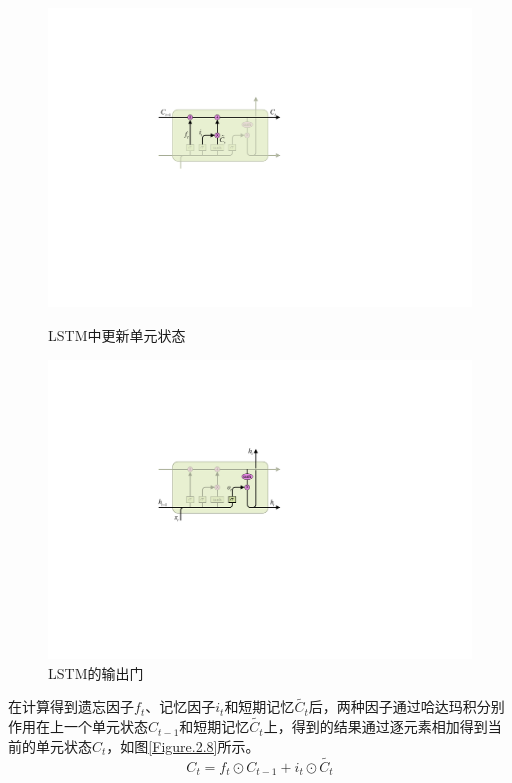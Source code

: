 \documentclass[master]{thesis-uestc}
\begin{document}
\begin{figure}[!ht]
\centering 
\begin{minipage}[b]{0.45\textwidth}
\centering
\includegraphics[width=1.0\textwidth]{./pic/LSTM-C.pdf}
\caption{LSTM中更新单元状态}
\label{Figure.2.8}
\end{minipage}
\begin{minipage}[b]{0.45\textwidth} 
\centering 
\includegraphics[width=1.0\textwidth]{./pic/LSTM-o.pdf}
\caption{LSTM的输出门}
\label{Figure.2.9}
\end{minipage}
\end{figure}
在计算得到遗忘因子$f_t$、记忆因子$i_t$和短期记忆$\tilde{C_{t}}$后，两种因子通过哈达玛积分别作用在上一个单元状态$C_{t-1}$和短期记忆$\tilde{C_{t}}$上，得到的结果通过逐元素相加得到当前的单元状态$C_t$，如图\ref{Figure.2.8}所示。
\begin{equation}
   C_{t} = f_t \odot C_{t-1} + i_t \odot \tilde{C_{t}}
\end{equation}
\end{document}

